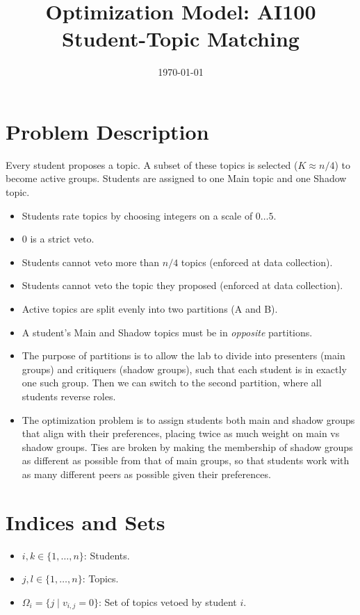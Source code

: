 \documentclass[12pt]{article}
\title{Optimization Model: AI100 Student-Topic Matching}
\author{}
\date{\today}
\begin{document}
	
	\maketitle
	
	\section{Problem Description}
	Every student proposes a topic. A subset of these topics is selected ($K \approx n/4$) to become active groups. Students are assigned to one {Main} topic and one {Shadow} topic.
	\begin{itemize}
		\item Students rate topics by choosing integers on a scale of $0\dots5$.
		\item $0$ is a strict veto.
		\item Students cannot veto more than $n/4$ topics (enforced at data collection).
		\item Students cannot veto the topic they proposed (enforced at data collection).
		\item Active topics are split evenly into two partitions (A and B).
		\item A student's Main and Shadow topics must be in \textit{opposite} partitions.
		\item The purpose of partitions is to allow the lab to divide into presenters (main groups) and critiquers (shadow groups), such that each student is in exactly one such group. Then we can switch to the second partition, where all students reverse roles.
		\item The optimization problem is to assign students both main and shadow groups that align with their preferences, placing twice as much weight on main vs shadow groups. Ties are broken by making the membership of shadow groups as different as possible from that of main groups, so that students work with as many different peers as possible given their preferences.
	\end{itemize}
	
	\section{Indices and Sets}
	\begin{itemize}
		\item $i, k \in \{1, \dots, n\}$: Students.
		\item $j, l \in \{1, \dots, n\}$: Topics.
		\item $\Omega_i = \{j \mid v_{i,j} = 0\}$: Set of topics vetoed by student $i$.
	\end{itemize}
	
\end{document}
